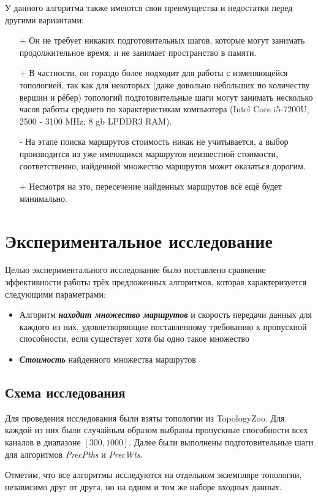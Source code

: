 \documentclass[a4paper]{article}
\begin{document}
У данного алгоритма также имеются свои преимущества и недостатки перед другими вариантами:
\begin{itemize}
\item[+] Он не требует никаких подготовительных шагов, которые могут занимать продолжительное время, и не занимает пространство в памяти.
\item[+] В частности, он гораздо более подходит для работы с изменяющейся топологией, так как для некоторых (даже довольно небольших по количеству вершин и рёбер) топологий подготовительные шаги могут занимать несколько часов работы среднего по характеристикам компьютера (Intel Core i5-7200U, 2500 - 3100 MHz; 8 gb LPDDR3 RAM).
\item[-] На этапе поиска маршрутов стоимость никак не учитывается, а выбор производится из уже имеющихся маршрутов неизвестной стоимости, соответственно, найденной множество маршрутов может оказаться дорогим.
\item[+] Несмотря на это, пересечение найденных маршрутов всё ещё будет минимально. 
\end{itemize}


\newpage
\section{Экспериментальное исследование}
Целью экспериментального исследование было поставлено сравнение эффективности работы трёх предложенных алгоритмов, которая характеризуется следующими параметрами:
\begin{itemize}
\item Алгоритм \textit{\textbf{находит множество маршрутов}} и скорость передачи данных для каждого из них, удовлетворяющие поставленному требованию к пропускной способности, если существует хотя бы одно такое множество
\item \textit{\textbf{Стоимость}} найденного множества маршрутов
\end{itemize}

\subsection{Схема исследования}
Для проведения исследования были взяты топологии из TopologyZoo. Для каждой из них были случайным образом выбраны пропускные способности всех каналов в диапазоне $[300, 1000]$. Далее были выполнены подготовительные шаги для алгоритмов \textit{PrecPths} и \textit{PrecWts}. 

Отметим, что все алгоритмы исследуются на отдельном экземпляре топологии, независимо друг от друга, но на одном и том же наборе входных данных.
\end{document}
